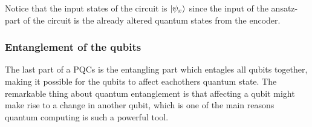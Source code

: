 \documentclass[../main.tex]{subfiles}
\begin{document}

Notice that the input states of the circuit is \ensuremath{\ket{\psi_x}} since the input of the ansatz-part of the circuit is the already altered quantum states from the encoder.

\subsubsection{Entanglement of the qubits}
The last part of a PQCs is the entangling part which entagles all qubits together, making it possible for the qubits to affect eachothers quantum state. The remarkable thing about quantum entanglement is that affecting a qubit might make rise to a change in another qubit, which is one of the main reasons quantum computing is such a powerful tool.
\end{document}
